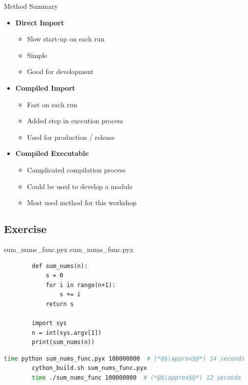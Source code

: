 \documentclass[11pt]{beamer}
\begin{document}
\begin{frame}[fragile]{Method Summary}
	\begin{itemize}[<+->]
		\item \textbf{Direct Import} 
		\begin{itemize}[<.->]
			\item Slow start-up on each run
			\item Simple
			\item Good for development
		\end{itemize}
		
		\item \textbf{Compiled Import}
		\begin{itemize}[<.->]
			\item Fast on each run
			\item Added step in execution process
			\item Used for production / release
		\end{itemize}
		
		\item \textbf{Compiled Executable}
		\begin{itemize}[<.->]
			\item Complicated compilation process
			\item Could be used to develop a module
			\item Most used method for this workshop
		\end{itemize}
	\end{itemize}
\end{frame}

\subsection{Exercise}
\begin{frame}[fragile]{sum\_nums\_func.pyx}
	sum\_nums\_func.pyx
	\pause
	\begin{lstlisting}
		def sum_nums(n):
		    s = 0
		    for i in range(n+1):
		        s += i
		    return s
		
		import sys
		n = int(sys.argv[1])
		print(sum_nums(n))
	\end{lstlisting}
	\pause
	\begin{lstlisting}[language=Bash]
		time python sum_nums_func.pyx 100000000  # (*@$\approx$@*) 14 seconds
		cython_build.sh sum_nums_func.pyx
		time ./sum_nums_func 100000000  # (*@$\approx$@*) 12 seconds
	\end{lstlisting}
\end{frame}
\end{document}
